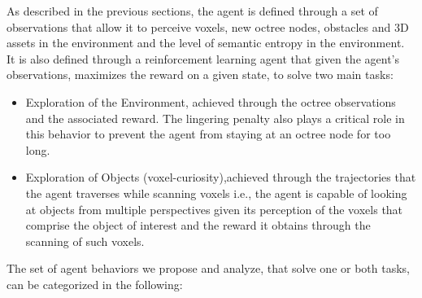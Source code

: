 As described in the previous sections, the agent is defined through a set of observations that allow it to perceive voxels, new octree nodes, obstacles and 3D assets in the environment and the level of semantic entropy in the environment. It is also defined through a reinforcement learning agent that given the agent's observations, maximizes the reward on a given state, to solve two main tasks:
\begin{itemize}
    \item Exploration of the Environment, achieved through the octree observations and the associated reward. The lingering penalty also plays a critical role in this behavior to prevent the agent from staying at an octree node for too long.
    \item Exploration of Objects (voxel-curiosity),achieved through the trajectories that the agent traverses while scanning voxels i.e., the agent is capable of looking at objects from multiple perspectives given its perception of the voxels that comprise the object of interest and the reward it obtains through the scanning of such voxels. 
\end{itemize}
The set of agent behaviors we propose and analyze, that solve one or both tasks, can be categorized in the following:
